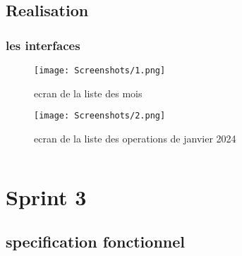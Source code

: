 \subsection{Realisation}
\subsubsection{les interfaces}
\begin{figure}[!htbp]
  \begin{minipage}[t]{0.4\textwidth}    %
          \texttt{[image: Screenshots/1.png]}
          \caption{ ecran de la liste des mois}
  \end{minipage}%
  \begin{minipage}{0.20\textwidth}
    \hfill
  \end{minipage}
\begin{minipage}[t]{0.4\textwidth}
        \texttt{[image: Screenshots/2.png]}
        \caption{ ecran de la liste des operations de janvier 2024}
\end{minipage}%
  \end{figure}
$ $
\newpage
\section{Sprint 3}
\subsection{specification fonctionnel}
